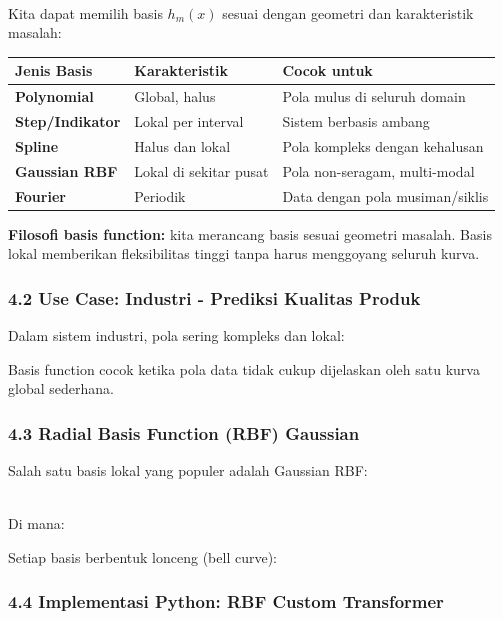 \documentclass[12pt,a4paper]{article}
\begin{document}
\\[
\hat{y}(x) = \beta_0 + \sum_{m=1}^{M} \beta_m h_m(x)
\\]


Kita dapat memilih basis $h_m(x)$ sesuai dengan geometri dan karakteristik masalah:


\begin{tabular}{|l|l|l|}
\hline
Jenis Basis & Karakteristik & Cocok untuk \\
\hline
\textbf{Polynomial} & Global, halus & Pola mulus di seluruh domain \\
\hline
\textbf{Step/Indikator} & Lokal per interval & Sistem berbasis ambang \\
\hline
\textbf{Spline} & Halus dan lokal & Pola kompleks dengan kehalusan \\
\hline
\textbf{Gaussian RBF} & Lokal di sekitar pusat & Pola non-seragam, multi-modal \\
\hline
\textbf{Fourier} & Periodik & Data dengan pola musiman/siklis \\
\hline
\end{tabular}


\textbf{Filosofi basis function:} kita merancang basis sesuai geometri masalah. Basis lokal memberikan fleksibilitas tinggi tanpa harus menggoyang seluruh kurva.


\subsubsection{4.2 Use Case: Industri - Prediksi Kualitas Produk}

Dalam sistem industri, pola sering kompleks dan lokal:


Basis function cocok ketika pola data tidak cukup dijelaskan oleh satu kurva global sederhana.


\subsubsection{4.3 Radial Basis Function (RBF) Gaussian}

Salah satu basis lokal yang populer adalah Gaussian RBF:


\\[
h_j(x) = \exp\left(-\gamma (x - c_j)^2\right)
\\]


Di mana:


Setiap basis berbentuk lonceng (bell curve):


\subsubsection{4.4 Implementasi Python: RBF Custom Transformer}
\end{document}
